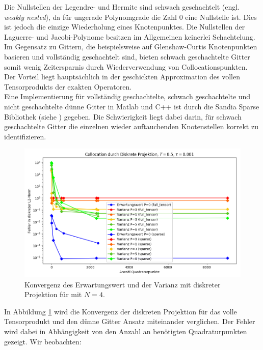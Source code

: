 Die Nullstellen der Legendre- und Hermite sind schwach geschachtelt (engl. \emph{weakly nested}), da für ungerade Polynomgrade die Zahl $0$ eine Nullstelle ist. Dies ist jedoch die einzige Wiederholung eines Knotenpunktes. Die Nullstellen der Laguerre- und Jacobi-Polynome besitzen im Allgemeinen keinerlei Schachtelung.\\
Im Gegensatz zu Gittern, die beispielsweise auf Glenshaw-Curtis Knotenpunkten basieren und vollständig geschachtelt sind, bieten schwach geschachtelte Gitter somit wenig Zeitersparnis durch Wiederverwendung von Collocationspunkten. Der Vorteil liegt hauptsächlich in der geschickten Approximation des vollen Tensorprodukts der exakten Operatoren.\\
Eine Implementierung für vollständig geschachtelte, schwach geschachtelte und nicht geschachtelte dünne Gitter in Matlab und C++ ist durch die Sandia Sparse Bibliothek (siehe \autocite{Sandia}) gegeben. Die Schwierigkeit liegt dabei darin, für schwach geschachtelte Gitter die einzelnen wieder auftauchenden Knotenstellen korrekt zu identifizieren.
\begin{figure}[!htb]
\includegraphics[width=\textwidth]{Figures/collocation_dp_trial8.png}
\caption{Konvergenz des Erwartungswert und der Varianz mit diskreter Projektion für  mit $N=4$.}
\label{fig:dp_trial8}
\end{figure}
In Abbildung \ref{fig:dp_trial8} wird die Konvergenz der diskreten Projektion für das volle Tensorprodukt und den dünne Gitter Ansatz miteinander verglichen. Der Fehler wird dabei in Abhängigkeit von den Anzahl an benötigten Quadraturpunkten gezeigt. Wir beobachten:
